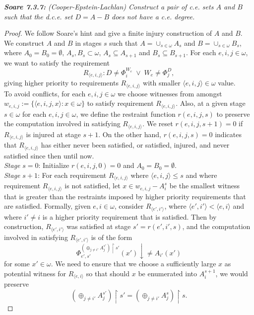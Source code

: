 \documentclass{article}
\begin{document}
\it \textbf{Soare 7.3.7:} (Cooper-Epstein-Lachlan) Construct a pair of c.e.
  sets $A$ and $B$ such that the d.c.e. set $D=A-B$ does not have a c.e.
  degree.

  \begin{proof}
    We follow Soare's hint and give a finite injury construction of $A$ and
    $B$. We construct $A$ and $B$ in stages $s$ such that
    $A=\cup_{s\in\omega}A_s$ and $B=\cup_{s\in\omega}B_s$, where
    $A_0=B_0=\emptyset$, $A_s,B_s\subset\omega$, $A_s\subseteq A_{s+1}$ and
    $B_s\subseteq B_{s+1}$. For each $e,i,j\in\omega$, we want to satisfy
    the requirement
    \[R_{\langle e,i,j\rangle}: D\neq \Phi_i^{W_e}\; \vee\;
    W_e\neq\Phi_j^D,\]
    giving higher priority to requirements $R_{\langle e,i,j\rangle}$ with
    smaller $\langle e,i,j\rangle\in\omega$ value. \\

    To avoid conflicts, for each $e,i,j\in\omega$ we choose witnesses from
    amongst $w_{e,i,j}:=\{\langle e,i,j,x\rangle: x\in\omega\}$ to satisfy
    requirement $R_{\langle e,i,j\rangle}$. Also, at a given stage
    $s\in\omega$ for each $e,i,j\in\omega$, we define the restraint
    function $r(e,i,j,s)$ to preserve the computation involved in
    satisfying $R_{\langle e,i,j\rangle}$. We reset $r(e,i,j,s+1)=0$ if
    $R_{\langle e,i,j\rangle}$ is injured at stage $s+1$. On the other
    hand, $r(e,i,j,s)=0$ indicates that $R_{\langle e,i,j\rangle}$ has
    either never been satisfied, or satisfied, injured, and never satisfied
    since then until now. \\

    \textit{Stage} $s=0$: Initialize $r(e,i,j,0)=0$ and
    $A_0=B_0=\emptyset$. \\

    \textit{Stage} $s+1$: For each requirement $R_{\langle e,i,j\rangle}$
    where $\langle e,i,j\rangle \leq s$ and where requirement $R_{\langle
    e,i,j\rangle}$ is not satisfied, let $x\in w_{e,i,j}-A_i^s$ be the
    smallest witness that is greater than the restraints imposed by
    higher priority requirements that are satisfied. Formally,
    given $e,i\in\omega$, consider $R_{\langle e',i'\rangle}$, where
    $\langle e',i'\rangle <\langle e,i\rangle$ and where $i'\neq i$ is
    a higher priority requirement that is satisfied. Then by
    construction, $R_{\langle e',i'\rangle}$
    was satisfied at stage $s'=r(e',i',s)$, and the computation
    involved in satisfying $R_{\langle e',i'\rangle}$ is of the form
    \[\Phi_{e',s'}^{(\oplus_{j\neq i'} A_{j}^{s'}) \restriction s'}
    (x')\downarrow\neq A_{i'}(x')\]
    for some $x'\in\omega$. We need to ensure that we choose a
    sufficiently large $x$ as potential witness for $R_{\langle
    e,i\rangle}$ so that should $x$ be enumerated into $A_i^{s+1}$, we
    would preserve
    \[(\oplus_{j\neq i'} A_{j}^{s'}) \restriction s' =(\oplus_{j\neq
    i'} A_{j}^{s}) \restriction s.\]


\end{proof}
\end{document}
